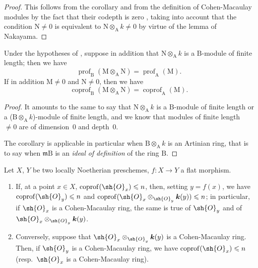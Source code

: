 \begin{proof}
This follows from the corollary  and from the definition of Cohen-Macaulay modules by the fact that their codepth is zero , taking into account that the condition $\mathrm{N}\neq 0$ is equivalent to $\mathrm{N}\otimes_\mathrm{A} k\neq 0$ by virtue of the lemma of Nakayama.
\end{proof}

\begin{corollary}[6.3.4]
\label{IV.6.3.4}
Under the hypotheses of , suppose in addition that $\mathrm{N}\otimes_\mathrm{A} k$ is a $\mathrm{B}$-module of finite length; then we have
\begin{equation}
  \operatorname{prof}_\mathrm{B}(\mathrm{M}\otimes_\mathrm{A}\mathrm{N})=\operatorname{prof}_\mathrm{A}(\mathrm{M}).
  \tag{6.3.4.1}
\end{equation}
If in addition $\mathrm{M}\neq 0$ and $\mathrm{N}\neq 0$, then we have
\begin{equation}
  \operatorname{coprof}_\mathrm{B}(\mathrm{M}\otimes_\mathrm{A}\mathrm{N})=\operatorname{coprof}_\mathrm{A}(\mathrm{M}).
  \tag{6.3.4.2}
\end{equation}
\end{corollary}

\begin{proof}
It amounts to the same to say that $\mathrm{N}\otimes_\mathrm{A} k$ is a $\mathrm{B}$-module of finite length or a ($\mathrm{B}\otimes_\mathrm{A} k$)-module of finite length, and we know  that modules of finite length $\neq 0$ are of dimension~$0$ and depth~$0$.

The corollary  is applicable in particular when $\mathrm{B}\otimes_\mathrm{A} k$ is an Artinian ring, that is to say when $\mathfrak{m}\mathrm{B}$ is an \emph{ideal of definition} of the ring $\mathrm{B}$.
\end{proof}

\begin{corollary}[6.3.5]
\label{IV.6.3.5}
Let $X$, $Y$ be two locally Noetherian preschemes, $f:X\to Y$ a flat morphism.
\begin{enumerate}[label=(\roman*)]
  \item If, at a point $x\in X$, $\operatorname{coprof}(\sh{O}_x)\leqslant n$, then, setting $y=f(x)$, we have $\operatorname{coprof}(\sh{O}_y)\leqslant n$ and $\operatorname{coprof}(\sh{O}_x\otimes_{\sh{O}_y}\boldsymbol{k}(y))\leqslant n$; in particular, if $\sh{O}_x$ is a Cohen-Macaulay ring, the same is true of $\sh{O}_y$ and of $\sh{O}_x\otimes_{\sh{O}_y}\boldsymbol{k}(y)$.
  \item Conversely, suppose that $\sh{O}_x\otimes_{\sh{O}_y}\boldsymbol{k}(y)$ is a Cohen-Macaulay ring.
Then, if $\sh{O}_y$ is a Cohen-Macaulay ring, we have $\operatorname{coprof}(\sh{O}_x)\leqslant n$ \textnormal{(}resp.\ $\sh{O}_x$ is a Cohen-Macaulay ring\textnormal{)}.
\end{enumerate}
\end{corollary}

